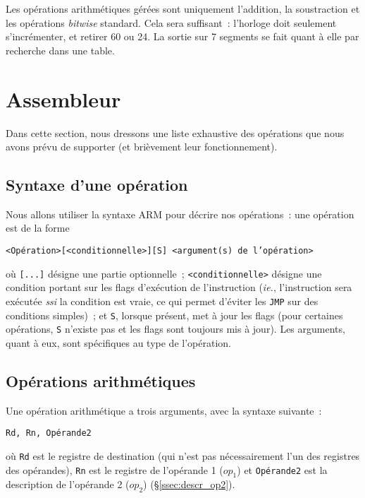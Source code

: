 \documentclass[11pt,a4paper]{article}
\begin{document}
Les opérations arithmétiques gérées sont uniquement l'addition, la soustraction et les opérations \emph{bitwise} standard. Cela sera suffisant~: l'horloge doit seulement s'incrémenter, et retirer 60 ou 24. La sortie sur 7 segments se fait quant à elle par recherche dans une table.

\section{Assembleur}

Dans cette section, nous dressons une liste exhaustive des opérations que nous avons prévu de supporter (et brièvement leur fonctionnement).

\subsection{Syntaxe d'une opération} \label{ssec:opsyntax}

Nous allons utiliser la syntaxe ARM pour décrire nos opérations~: une opération est de la forme

\begin{center}\texttt{<Opération>[<conditionnelle>][S] <argument(s) de l'opération>}\end{center}

où \texttt{[...]} désigne une partie optionnelle~; \texttt{<conditionnelle>} désigne une condition portant sur les flags d'exécution de l'instruction (\textit{ie.}, l'instruction sera exécutée \textit{ssi} la condition est vraie, ce qui permet d'éviter les \texttt{JMP} sur des conditions simples)~; et \texttt{S}, lorsque présent, met à jour les flags (pour certaines opérations, \texttt{S} n'existe pas et les flags sont toujours mis à jour). Les arguments, quant à eux, sont spécifiques au type de l'opération.

\subsection{Opérations arithmétiques}

Une opération arithmétique a trois arguments, avec la syntaxe suivante~:

\begin{center}\texttt{Rd, Rn, Opérande2}\end{center}

où \texttt{Rd} est le registre de destination (qui n'est pas nécessairement l'un des registres des opérandes), \texttt{Rn} est le registre de l'opérande 1 ($op_1$) et \texttt{Opérande2} est la description de l'opérande 2 ($op_2$) (§\ref{ssec:descr_op2}).
\end{document}
